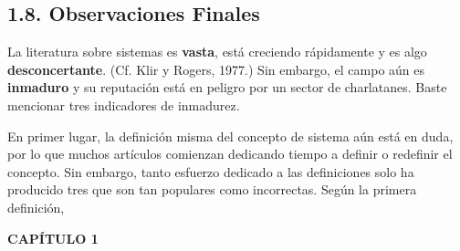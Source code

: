 {\subsection*{1.8. Observaciones Finales}
La literatura sobre sistemas es \textbf{vasta}, está creciendo rápidamente y es algo \textbf{desconcertante}. (Cf. Klir y Rogers, 1977.) Sin embargo, el campo aún es \textbf{inmaduro} y su reputación está en peligro por un sector de charlatanes. Baste mencionar tres indicadores de inmadurez.

En primer lugar, la definición misma del concepto de sistema aún está en duda, por lo que muchos artículos comienzan dedicando tiempo a definir o redefinir el concepto. Sin embargo, tanto esfuerzo dedicado a las definiciones solo ha producido tres que son tan populares como incorrectas. Según la primera definición,
}

\newpage
\fancyhf{}
\fancyhead[l]{\thepage} 
\begin{center}
{\fontsize{13}{16}\selectfont \textbf{CAPÍTULO 1}}
\end{center}
\vspace{0.5cm}


